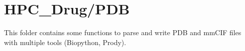 

\section{HPC\_Drug/PDB}
	
	This folder contains some functions to parse and write PDB and mmCIF files with multiple tools (Biopython, Prody).
	
	

	

	

	

	

